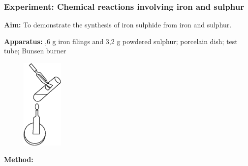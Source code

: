             \subsubsection{ Experiment: Chemical reactions involving iron and sulphur }
            \nopagebreak
            \label{m38709*id63437}\noindent{}\textbf{Aim:}
          \newline
     To demonstrate the synthesis of iron sulphide from iron and sulphur.\par 
        \label{m38709*id63447}\noindent{}\textbf{Apparatus:}
          ,6 g iron filings and 3,2 g powdered sulphur; porcelain dish; test tube; Bunsen burner\par 
        \label{m38709*id63457}
    \setcounter{subfigure}{0}
	\begin{figure}[H] %
    \begin{center}
    \label{m38709*id63460!!!underscore!!!media}\label{m38709*id63460!!!underscore!!!printimage}\includegraphics[width=2cm]{col11305.imgs/m38709_CG10C4_006.png} %
      \vspace{2pt}
    \vspace{.1in}
    \end{center}
 \end{figure}       
        \par 
        \label{m38709*id63467}\noindent{}\textbf{Method:}
          \newline
